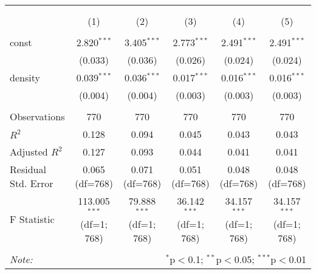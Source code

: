 \begin{table}[!htbp] \centering
\begin{tabular}{@{\extracolsep{5pt}}lccccc}
\\[-1.8ex]\hline
\hline \\[-1.8ex]
\\[-1.8ex] & (1) & (2) & (3) & (4) & (5) \\
\hline \\[-1.8ex]
 const & 2.820$^{***}$ & 3.405$^{***}$ & 2.773$^{***}$ & 2.491$^{***}$ & 2.491$^{***}$ \\
& (0.033) & (0.036) & (0.026) & (0.024) & (0.024) \\
 density & 0.039$^{***}$ & 0.036$^{***}$ & 0.017$^{***}$ & 0.016$^{***}$ & 0.016$^{***}$ \\
& (0.004) & (0.004) & (0.003) & (0.003) & (0.003) \\
\hline \\[-1.8ex]
 Observations & 770 & 770 & 770 & 770 & 770 \\
 $R^2$ & 0.128 & 0.094 & 0.045 & 0.043 & 0.043 \\
 Adjusted $R^2$ & 0.127 & 0.093 & 0.044 & 0.041 & 0.041 \\
 Residual Std. Error & 0.065 (df=768) & 0.071 (df=768) & 0.051 (df=768) & 0.048 (df=768) & 0.048 (df=768) \\
 F Statistic & 113.005$^{***}$ (df=1; 768) & 79.888$^{***}$ (df=1; 768) & 36.142$^{***}$ (df=1; 768) & 34.157$^{***}$ (df=1; 768) & 34.157$^{***}$ (df=1; 768) \\
\hline
\hline \\[-1.8ex]
\textit{Note:} & \multicolumn{5}{r}{$^{*}$p$<$0.1; $^{**}$p$<$0.05; $^{***}$p$<$0.01} \\
\end{tabular}
\end{table}